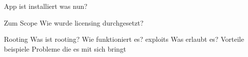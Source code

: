 App ist installiert was nun?

Zum Scope
Wie wurde licensing durchgesetzt?

Rooting
Was ist rooting?
Wie funktioniert es? exploits
Was erlaubt es?
Vorteile
beispiele
Probleme die es mit sich bringt

